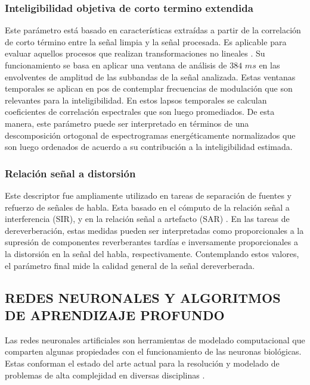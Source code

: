 \subsubsection{Inteligibilidad objetiva de corto termino extendida}
Este parámetro está basado en características extraídas a partir de la correlación de corto término entre la señal limpia y la señal procesada. Es aplicable para evaluar aquellos procesos que realizan transformaciones no lineales \cite{ESTOI}. Su funcionamiento se basa en aplicar una ventana de análisis de $384$ $ms$ en las envolventes de amplitud de las subbandas de la señal analizada. Estas ventanas temporales se aplican en pos de contemplar frecuencias de modulación que son relevantes para la inteligibilidad. En estos lapsos temporales se calculan coeficientes de correlación espectrales que son luego promediados. De esta manera, este parámetro puede ser interpretado en términos de una descomposición ortogonal de espectrogramas energéticamente normalizados que son luego ordenados de acuerdo a su contribución a la inteligibilidad estimada. 

\subsubsection{Relación señal a distorsión}

Este descriptor fue ampliamente utilizado en tareas de separación de fuentes y refuerzo de señales de habla. Esta basado en el cómputo de la relación señal a interferencia (SIR), y en la relación señal a artefacto (SAR) \cite{SAR}. En las tareas de dereverberación, estas medidas pueden ser interpretadas como proporcionales a la supresión de componentes reverberantes tardías e inversamente proporcionales a la distorsión en la señal del habla, respectivamente. Contemplando estos valores, el parámetro final mide la calidad general de la señal dereverberada.  

\subsection[Redes neuronales y algoritmos de aprendizaje profundo]{REDES NEURONALES Y ALGORITMOS DE APRENDIZAJE PROFUNDO}
Las redes neuronales artificiales son herramientas de modelado computacional que comparten algunas propiedades con el funcionamiento de las neuronas biológicas. Estas conforman el estado del arte actual para la resolución y modelado de problemas de alta complejidad en diversas disciplinas \cite{ANN_intro}. 

